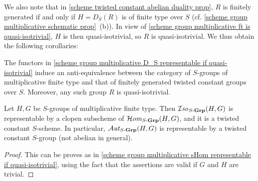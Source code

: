 We also note that in \cref{scheme twisted constant abelian duality prop}, $R$ is finitely generated if and only if $H=D_S(R)$ is of finite type over $S$ (cf. \cref{scheme group multiplicative schematic prop}~(b)). In view of \cref{scheme group multiplicative ft is quasi-isotrivial}, $H$ is then quasi-isotrivial, so $R$ is quasi-isotrivial. We thus obtain the following corollaries:

\begin{corollary}\label{scheme group multiplicative ft cat equivalent to ft twisted constant}
The functors in \cref{scheme group multiplicative D_S representable if quasi-isotrivial} induce an anti-equivalence between the category of $S$-groups of multiplicative finite type and that of finitely generated twisted constant groups over $S$. Moreover, any such group $R$ is quasi-isotrivial.
\end{corollary}

\begin{corollary}\label{scheme group multiplicative ft sIso representable}
Let $H,G$ be $S$-groups of multiplicative finite type. Then $\operatorname{\mathcal{I}\hspace*{-0.5pt}\textit{so}\hspace{0.5pt}}_{S\textup{-}\mathbf{Grp}}(H,G)$ is representable by a clopen subscheme of $\operatorname{\mathcal{H}\hspace*{-0.4pt}\textit{om}\hspace{0.5pt}}_{S\textup{-}\mathbf{Grp}}(H,G)$, and it is a twisted constant $S$-scheme. In particular, $\operatorname{\mathcal{A}\hspace*{-0.2pt}\textit{ut}\hspace{0.5pt}}_{S\textup{-}\mathbf{Grp}}(H,G)$ is representable by a twisted constant $S$-group (not abelian in general).
\end{corollary}
\begin{proof}
This can be proves as in \cref{scheme group multiplicative sHom representable if quasi-isotrivial}, using the fact that the assertions are valid if $G$ and $H$ are trivial.
\end{proof}

